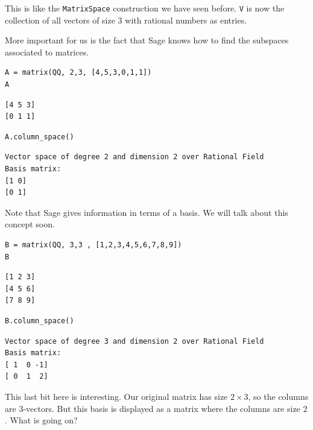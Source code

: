 \documentclass[10pt,]{book}
\theoremstyle{plain}
\theoremstyle{definition}
\numberwithin{equation}{section}
\begin{document}
      This is like the \verb?MatrixSpace? construction we have seen before.
      \verb?V? is now the collection of all vectors of size \(3\) with
      rational numbers as entries.
\par

      More important for us is the fact that Sage knows how to find the subspaces
      associated to matrices.
\begin{lstlisting}[style=sageinput]
A = matrix(QQ, 2,3, [4,5,3,0,1,1])
A
\end{lstlisting}
\begin{lstlisting}[style=sageoutput]
[4 5 3]
[0 1 1]
\end{lstlisting}
\begin{lstlisting}[style=sageinput]
A.column_space()
\end{lstlisting}
\begin{lstlisting}[style=sageoutput]
Vector space of degree 2 and dimension 2 over Rational Field
Basis matrix:
[1 0]
[0 1]
\end{lstlisting}
\par

      Note that Sage gives information in terms of a basis. We will talk about
      this concept soon.
\begin{lstlisting}[style=sageinput]
B = matrix(QQ, 3,3 , [1,2,3,4,5,6,7,8,9])
B
\end{lstlisting}
\begin{lstlisting}[style=sageoutput]
[1 2 3]
[4 5 6]
[7 8 9]
\end{lstlisting}
\begin{lstlisting}[style=sageinput]
B.column_space()
\end{lstlisting}
\begin{lstlisting}[style=sageoutput]
Vector space of degree 3 and dimension 2 over Rational Field
Basis matrix:
[ 1  0 -1]
[ 0  1  2]
\end{lstlisting}
\par

      This last bit here is interesting.
      Our original matrix has size \(2\times 3\), so the columns are \(3\)-vectors.
      But this basis is displayed as a matrix where the columns are size \(2\).
      What is going on?
\par
\end{document}
